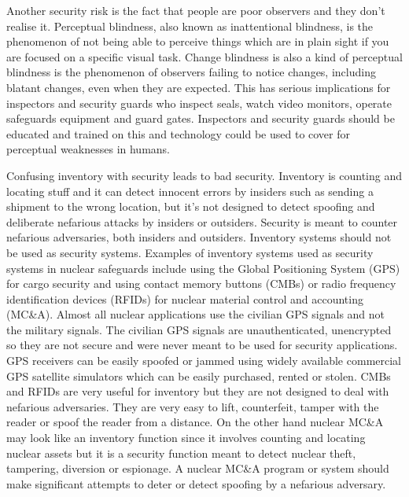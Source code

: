 \documentclass[twoside,titlepage,11pt,twocolumn,a4paper]{article}
\begin{document}
Another security risk is the fact that people are poor observers and
they don't realise it. Perceptual blindness, also known as
inattentional blindness, is the phenomenon of not being able to
perceive things which are in plain sight if you are focused on a
specific visual task. Change blindness is also a kind of perceptual
blindness is the phenomenon of observers failing to notice changes,
including blatant changes, even when they are expected. This has
serious implications for inspectors and security guards who inspect
seals, watch video monitors, operate safeguards equipment and guard
gates. Inspectors and security guards should be educated and trained
on this and technology could be used to cover for perceptual
weaknesses in humans. \citep{insiderThreat2011}

Confusing inventory with security leads to bad security. Inventory is
counting and locating stuff and it can detect innocent errors by
insiders such as sending a shipment to the wrong location, but it’s
not designed to detect spoofing and deliberate nefarious attacks by
insiders or outsiders. \citep{handbookSecBlunders2010} Security is
meant to counter nefarious adversaries, both insiders and
outsiders. \citep{insiderThreat2011} Inventory systems should not be
used as security systems. Examples of inventory systems used as
security systems in nuclear safeguards include using the Global
Positioning System (GPS) for cargo security and using contact memory
buttons (CMBs) or radio frequency identification devices (RFIDs) for
nuclear material control and accounting
(MC\&A). \citep{handbookSecBlunders2010} Almost all nuclear
applications use the civilian GPS signals and not the military
signals.  The civilian GPS signals are unauthenticated, unencrypted so
they are not secure and were never meant to be used for security
applications. GPS receivers can be easily spoofed or jammed using
widely available commercial GPS satellite simulators which can be
easily purchased, rented or stolen. CMBs and RFIDs are very useful for
inventory but they are not designed to deal with nefarious
adversaries. They are very easy to lift, counterfeit, tamper with the
reader or spoof the reader from a
distance. \citep{nuclearSafeguardsAndSec2005} On the other hand
nuclear MC\&A may look like an inventory function since it involves
counting and locating nuclear assets but it is a security function
meant to detect nuclear theft, tampering, diversion or espionage.  A
nuclear MC\&A program or system should make significant attempts to
deter or detect spoofing by a nefarious
adversary. \citep{handbookSecBlunders2010}
\end{document}
